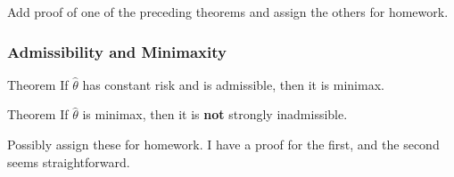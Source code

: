 \begin{frame}
Add proof of one of the preceding theorems and assign the others for homework.
\end{frame}
\begin{frame}
  \frametitle{Admissibility and Minimaxity}

  \begin{block}{Theorem}
    If $\widehat{\theta}$ has constant risk and is admissible, then it is minimax.
  \end{block}

  \begin{block}{Theorem}
    If $\widehat{\theta}$ is minimax, then it is \textbf{not} strongly inadmissible.
  \end{block}

  \alert{Possibly assign these for homework. I have a proof for the first, and the second seems straightforward.}
\end{frame}

